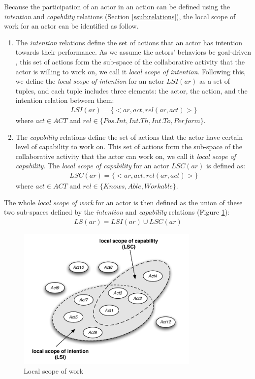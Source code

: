 Because the participation of an actor in an action can be defined using the \emph{intention} and \emph{capability} relations (Section \ref{ssub:relations}), the local scope of work for an actor can be identified as follow. 

\begin{enumerate}
	\item The \emph{intention} relations define the set of actions that an actor has intention towards their performance. As we assume the actors' behaviors be goal-driven \cite{nardi1996context}, this set of actions form the sub-space of the collaborative activity that the actor is willing to work on, we call it \emph{local scope of intention}. Following this, we define the \emph{local scope of intention} for an actor $LSI(ar)$ as a set of tuples, and each tuple includes three elements: the actor, the action, and the intention relation between them:
		\begin{align*} 
			LSI(ar) = \{<ar, act, rel(ar, act)>\}
		\end{align*}
		where $act\in ACT$ and $rel\in \{Pos.Int, Int.Th, Int.To, Perform\}$.
	\item The \emph{capability} relations define the set of actions that the actor have certain level of capability to work on. This set of actions form the sub-space of the collaborative activity that the actor can work on, we call it \emph{local scope of capability}. The \emph{local scope of capability} for an actor $LSC(ar)$ is defined as:
		\begin{align*} 
			LSC(ar) = \{<ar, act, rel(ar, act)>\}
		\end{align*}
		where $act\in ACT$ and $rel\in \{Knows, Able, Workable\}$.
\end{enumerate}

The whole \emph{local scope of work} for an actor is then defined as the union of these two sub-spaces defined by the \emph{intention} and \emph{capability} relations (Figure \ref{fig:local_scope}):
\begin{align*} 
	LS(ar) = LSI(ar) \cup LSC(ar)
\end{align*}

\begin{figure}[htbp] %
   \centering
   \includegraphics[width=3.5in]{local_scope.pdf} 
   \caption{Local scope of work}
   \label{fig:local_scope}
\end{figure}

